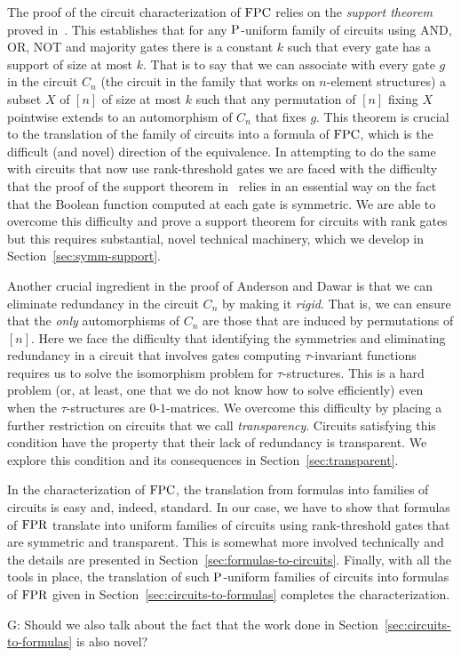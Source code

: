 \documentclass[../paper.tex]{subfiles}
\begin{document}
The proof of the circuit characterization of $\text{\upshape FPC}$ relies on the
\emph{support theorem} proved in~\cite{AndersonD17}.  This establishes
that for any $\mathrm{P}$-uniform family of circuits using AND, OR, NOT and
majority gates there is a constant $k$ such that every gate has a
support of size at most $k$.  That is to say that we can associate
with every gate $g$ in the circuit $C_n$ (the circuit in the family
that works on $n$-element structures) a subset $X$ of $[n]$ of size at
most $k$ such that any permutation of $[n]$ fixing $X$ pointwise
extends to an automorphism of $C_n$ that fixes $g$.  This theorem is
crucial to the translation of the family of circuits into a formula of
$\text{\upshape FPC}$, which is the difficult (and novel) direction of the
equivalence.  In attempting to do the same with circuits that now use
rank-threshold gates we are faced with the difficulty that the proof
of the support theorem in~\cite{AndersonD17} relies in an essential
way on the fact that the Boolean function computed at each gate is
symmetric.  We are able to overcome this difficulty and prove a
support theorem for circuits with rank gates but this requires
substantial, novel technical machinery, which we develop in
Section~\ref{sec:symm-support}. 

Another crucial ingredient in the proof of Anderson and Dawar is that
we can eliminate redundancy in the circuit $C_n$ by making it
\emph{rigid}.  That is, we can ensure that the \emph{only}
automorphisms of $C_n$ are those that are induced by permutations of
$[n]$.  Here we face the difficulty that identifying the symmetries
and eliminating redundancy in a circuit that involves gates computing
$\tau$-invariant functions requires us to solve the isomorphism
problem for $\tau$-structures.  This is a hard problem (or, at least,
one that we do not know how to solve efficiently) even when the
$\tau$-structures are $0$-$1$-matrices.  We overcome this difficulty
by placing a further restriction on circuits that we call
\emph{transparency}.  Circuits satisfying this condition have the
property that their lack of redundancy is transparent.  We explore
this condition and its consequences in Section~\ref{sec:transparent}.

In the characterization of $\text{\upshape FPC}$, the translation from formulas into
families of circuits is easy and, indeed, standard.  In our case, we
have to show that formulas of $\text{\upshape FPR}$ translate into uniform families of
circuits using rank-threshold gates that are symmetric and
transparent.  This is somewhat more involved technically and the
details are presented in Section~\ref{sec:formulas-to-circuits}.
Finally, with all the tools in place, the translation of such
$\mathrm{P}$-uniform families of circuits into formulas of $\text{\upshape FPR}$ given in Section~\ref{sec:circuits-to-formulas} completes
the characterization.

\begin{remark}
G: Should we also talk about the fact that the work done in
Section~\ref{sec:circuits-to-formulas} is also novel?
\end{remark}
\end{document}
